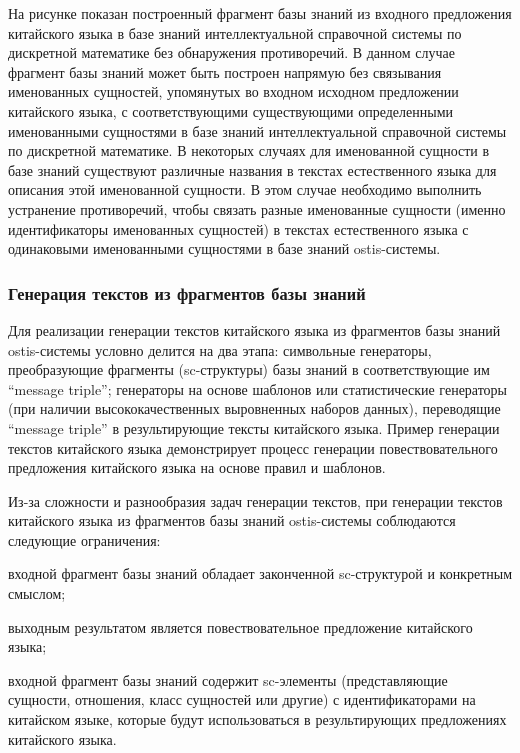 На рисунке \textit{} показан построенный фрагмент базы знаний из входного предложения китайского языка в базе знаний интеллектуальной справочной системы по дискретной математике без обнаружения противоречий. В данном случае фрагмент базы знаний может быть построен напрямую без связывания именованных сущностей, упомянутых во входном исходном предложении китайского языка, с соответствующими существующими определенными именованными сущностями в базе знаний интеллектуальной справочной системы по дискретной математике. В некоторых случаях для именованной сущности в базе знаний существуют различные названия в текстах естественного языка для описания этой именованной сущности. В этом случае необходимо выполнить устранение противоречий, чтобы связать разные именованные сущности (именно идентификаторы именованных сущностей) в текстах естественного языка с одинаковыми именованными сущностями в базе знаний ostis-системы. 
\subsubsection{Генерация текстов из фрагментов базы знаний}
Для реализации генерации текстов китайского языка из фрагментов базы знаний ostis-системы условно делится на два этапа: символьные генераторы, преобразующие фрагменты (sc-структуры) базы знаний в соответствующие им ``message triple''; генераторы на основе шаблонов или статистические генераторы (при наличии высококачественных выровненных наборов данных), переводящие ``message triple'' в результирующие тексты китайского языка. Пример генерации текстов китайского языка демонстрирует процесс генерации повествовательного предложения китайского языка на основе правил и шаблонов.

Из-за сложности и разнообразия задач генерации текстов, при генерации текстов китайского языка из фрагментов базы знаний ostis-системы соблюдаются следующие ограничения:
\begin{textitemize}
	\item входной фрагмент базы знаний обладает законченной sc-структурой и конкретным смыслом;
	\item выходным результатом является повествовательное предложение китайского языка;
	\item входной фрагмент базы знаний содержит sc-элементы (представляющие сущности, отношения, класс сущностей или другие) с идентификаторами на китайском языке, которые будут использоваться в результирующих предложениях китайского языка.
\end{textitemize}

